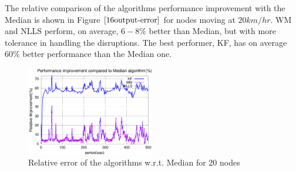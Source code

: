 \documentclass[journal]{IEEEtran}
\begin{document}
\par
The relative comparison of the algorithms performance improvement with the Median is shown in Figure $\ref{16output-error}$ for nodes moving at $20km/hr$. WM and NLLS perform, on average, $6-8\%$ better than Median, but with more tolerance in handling the disruptions. The best performer, KF, has on average $60\%$ better performance than the Median one.
\begin{figure}
\centering \includegraphics[width=0.5\textwidth]{16output-error}
\caption{Relative error of the algorithms w.r.t. Median for 20 nodes}
\label{16output-error}
\end{figure}
\end{document}

